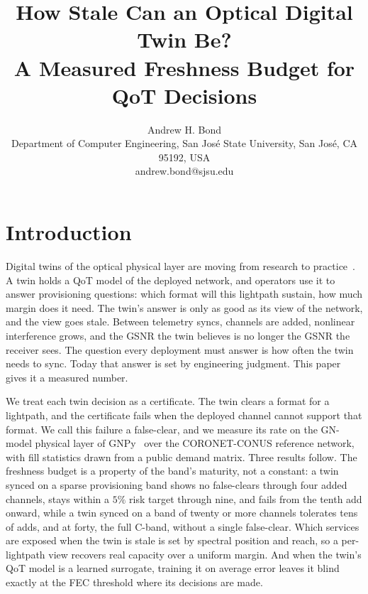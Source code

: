 \documentclass[10pt,twocolumn]{article}
\title{\vspace{-2em}\textbf{How Stale Can an Optical Digital Twin Be?\\
A Measured Freshness Budget for QoT Decisions}}
\author{Andrew H. Bond\\
\small Department of Computer Engineering, San Jos\'e State University, San Jos\'e, CA 95192, USA\\
\small andrew.bond@sjsu.edu}
\date{}
\begin{document}

\section{Introduction}
Digital twins of the optical physical layer are moving from research to
practice~\cite{dtwin}. A twin holds a QoT model of the deployed network, and
operators use it to answer provisioning questions: which format will this lightpath
sustain, how much margin does it need. The twin's answer is only as good as its view
of the network, and the view goes stale. Between telemetry syncs, channels are added,
nonlinear interference grows, and the GSNR the twin believes is no longer the GSNR
the receiver sees. The question every deployment must answer is how often the twin
needs to sync. Today that answer is set by engineering judgment. This paper gives it
a measured number.

We treat each twin decision as a certificate. The twin clears a format for a
lightpath, and the certificate fails when the deployed channel cannot support that
format. We call this failure a false-clear, and we measure its rate on the GN-model
physical layer of GNPy~\cite{gnpy} over the CORONET-CONUS reference network, with
fill statistics drawn from a public demand matrix. Three results follow. The
freshness budget is a property of the band's maturity, not a constant: a twin
synced on a sparse provisioning band shows no false-clears through four added
channels, stays within a $5\%$ risk target through nine, and fails from the
tenth add onward, while a twin synced on a band of twenty or more channels
tolerates tens of adds, and at forty, the full C-band, without a single
false-clear. Which services are exposed when the twin is stale is set by
spectral position and reach, so a per-lightpath view recovers real capacity
over a uniform margin. And when the twin's QoT model is a learned surrogate,
training it on average error leaves it blind exactly at the FEC threshold where
its decisions are made.
\end{document}
